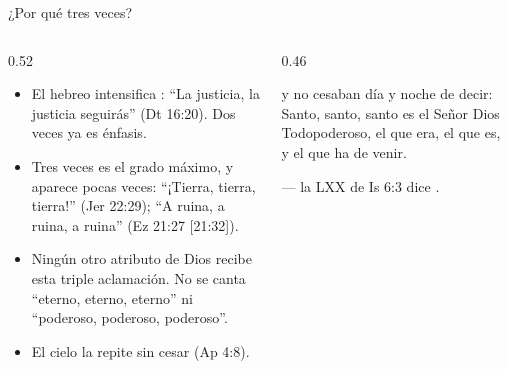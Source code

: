 \begin{frame}{¿Por qué tres veces?}
\begin{columns}[t,onlytextwidth]
\begin{column}{0.52\textwidth}\small
\begin{itemize}
\item El hebreo intensifica : ``La justicia, la justicia seguirás'' (Dt 16:20). Dos veces ya es énfasis.
\item Tres veces es el grado máximo, y aparece pocas veces: ``¡Tierra, tierra, tierra!'' (Jer 22:29); ``A ruina, a ruina, a ruina'' (Ez 21:27 [21:32]).
\item Ningún otro atributo de Dios recibe esta triple aclamación. No se canta ``eterno, eterno, eterno'' ni ``poderoso, poderoso, poderoso''.
\item El cielo la repite sin cesar (Ap 4:8).
\end{itemize}
\end{column}
\begin{column}{0.46\textwidth}
\begin{cita}y no cesaban día y noche de decir: Santo, santo, santo es el Señor Dios Todopoderoso, el que era, el que es, y el que ha de venir.\end{cita}
\scriptsize{} --- la LXX de Is 6:3 dice .
\end{column}
\end{columns}
\end{frame}

